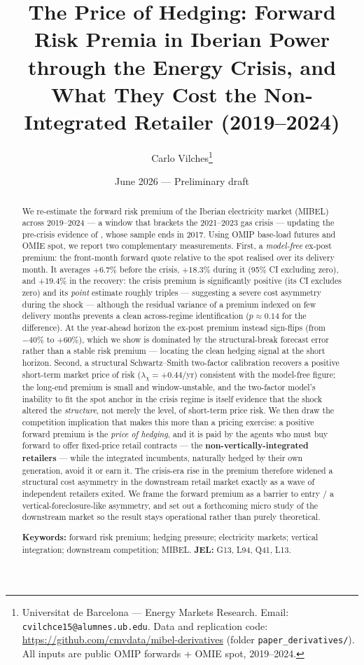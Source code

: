 \documentclass[11pt,a4paper]{article}
\title{The Price of Hedging: Forward Risk Premia in Iberian Power
through the Energy Crisis, and What They Cost the
Non-Integrated Retailer (2019--2024)}
\author{Carlo Vilches\thanks{Universitat de Barcelona --- Energy Markets Research.
Email: \texttt{cvilchce15@alumnes.ub.edu}. Data and replication code:
\url{https://github.com/cmvdata/mibel-derivatives} (folder \texttt{paper\_derivatives/}).
All inputs are public OMIP forwards + OMIE spot, 2019--2024.}}
\date{June 2026 --- Preliminary draft}
\begin{document}
\maketitle

\begin{abstract}
\noindent We re-estimate the forward risk premium of the Iberian electricity
market (MIBEL) across 2019--2024 --- a window that brackets the 2021--2023 gas
crisis --- updating the pre-crisis evidence of \citet{ferreira2018}, whose sample
ends in 2017. Using OMIP base-load futures and OMIE spot, we report two
complementary measurements. First, a \emph{model-free} ex-post premium: the
front-month forward quote relative to the spot realised over its delivery month.
It averages $+6.7\%$ before the crisis, $+18.3\%$ during it (95\% CI excluding
zero), and $+19.4\%$ in the recovery: the crisis premium is significantly positive (its CI
excludes zero) and its \emph{point} estimate roughly triples --- suggesting a severe
cost asymmetry during the shock --- although the residual variance of a premium
indexed on few delivery months prevents a clean across-regime identification
($p\approx0.14$ for the difference). At the
year-ahead horizon the ex-post premium instead sign-flips (from $-40\%$ to
$+60\%$), which we show is dominated by the structural-break forecast error rather
than a stable risk premium --- locating the clean hedging signal at the short
horizon. Second,
a structural Schwartz--Smith two-factor calibration recovers a positive
short-term market price of risk ($\lambda_\chi=+0.44$/yr) consistent with the
model-free figure; the long-end premium is small and window-unstable, and the
two-factor model's inability to fit the spot anchor in the crisis regime is
itself evidence that the shock altered the \emph{structure}, not merely the level,
of short-term price risk. We then draw the competition implication that makes this
more than a pricing exercise: a positive forward premium is the \emph{price of
hedging}, and it is paid by the agents who must buy forward to offer fixed-price
retail contracts --- the \textbf{non-vertically-integrated retailers} --- while
the integrated incumbents, naturally hedged by their own generation, avoid it or
earn it. The crisis-era rise in the premium therefore widened a structural
cost asymmetry in the downstream retail market exactly as a wave of independent
retailers exited. We frame the forward premium as a barrier to entry / a
vertical-foreclosure-like asymmetry, and set out a forthcoming micro study of the
downstream market so the result stays operational rather than purely theoretical.

\medskip
\noindent\textbf{Keywords:} forward risk premium; hedging pressure; electricity
markets; vertical integration; downstream competition; MIBEL.
\quad\textbf{JEL:} G13, L94, Q41, L13.
\end{abstract}
\end{document}
